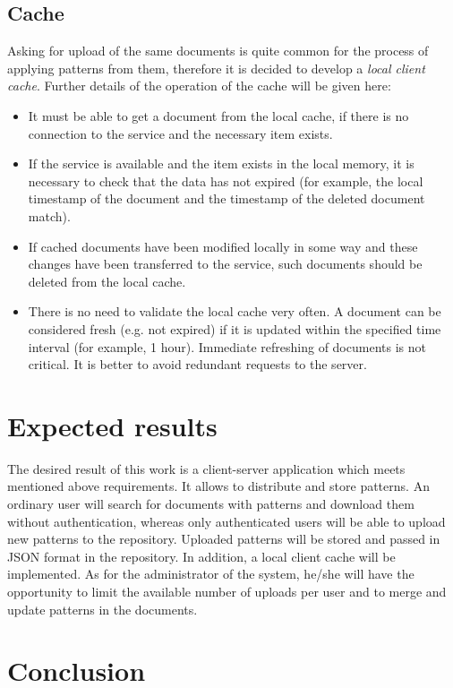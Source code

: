 \documentclass[letterpaper, 10 pt, conference]{ieeeconf}  %
\begin{document}
\subsection{Cache}
Asking for upload of the same documents is quite common for the process of
applying patterns from them, therefore it is decided to develop a 
\emph{local client cache}. 
Further details of the operation of the cache will be given here:
\begin{itemize}
    \item It must be able to get a document from the local cache, if there
    is no connection to the service and the necessary item exists.
    \item If the service is available and the item exists in the
    local memory, it is necessary to check that the data has not expired
    (for example, the local timestamp of the document and the timestamp of
    the deleted document match).
    \item If cached documents have been modified locally in some way
    and these changes have been transferred to the service, such documents
    should be deleted from the local cache.
    \item There is no need to validate the local cache very often.
    A document can be considered fresh (e.g. not expired) if it is
    updated within the specified time interval (for example, 1 hour).
    Immediate refreshing of documents is not critical. 
    It is better to avoid redundant requests to the server.
\end{itemize}

\section{Expected results}
\label{section:results}

The desired result of this work is a client-server application which
meets mentioned above requirements. 
It allows to distribute and store patterns.
An ordinary user will search for documents with patterns and download them
without authentication, whereas only authenticated users will be able to 
upload new patterns to the repository. 
Uploaded patterns will be stored and passed in JSON format in the repository.
In addition, a local client cache will be implemented.
As for the administrator of the system, he/she will have the opportunity to
limit the available number of uploads per user and to merge and update 
patterns in the documents. 

\section{Conclusion}
\label{section:conclusion}
\end{document}
